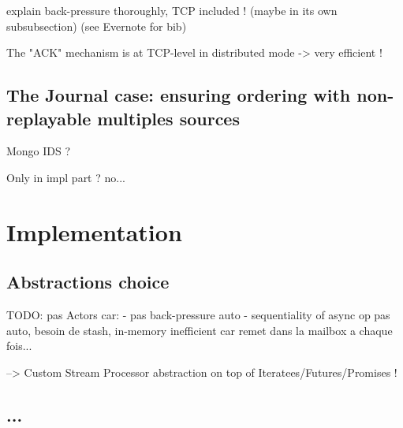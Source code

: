 explain back-pressure thoroughly, TCP included ! (maybe in its own subsubsection) (see Evernote for bib)

The "ACK" mechanism is at TCP-level in distributed mode -> very efficient !


\subsection{The Journal case: ensuring ordering with non-replayable multiples sources}

Mongo IDS ?

Only in impl part ? no...



\section{Implementation}
\label{sec:streamimplementation}

\subsection{Abstractions choice}

TODO: pas Actors car:
- pas back-pressure auto
- sequentiality of async op pas auto, besoin de stash, in-memory inefficient car remet dans la mailbox a chaque fois...

--> Custom Stream Processor abstraction on top of Iteratees/Futures/Promises !

\subsection{...}



